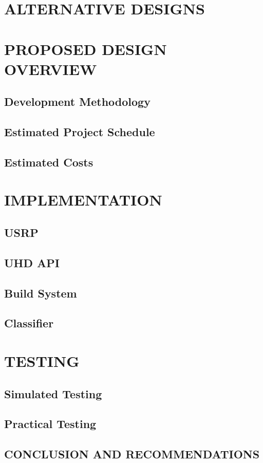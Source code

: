 \documentclass[10pt,twocolumn]{witseiepaper}
\begin{document}
\section{ALTERNATIVE DESIGNS}

\section{PROPOSED DESIGN OVERVIEW}
\subsection{Development Methodology}
\subsection{Estimated Project Schedule}
\subsection{Estimated Costs}

\section{IMPLEMENTATION}
\subsection{USRP}
\subsection{UHD API}
\subsection{Build System}
\subsection{Classifier}

\section{TESTING}
\subsection{Simulated Testing}
\subsection{Practical Testing}

\subsection{CONCLUSION AND RECOMMENDATIONS}



 
\end{document}
